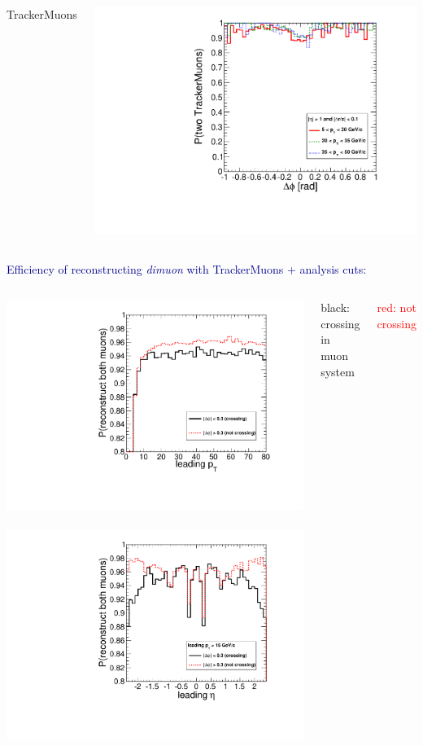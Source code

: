 \documentclass[compress]{beamer}
\begin{document}
\begin{frame}
\begin{columns}
\centering TrackerMuons

\includegraphics[width=\linewidth]{endcap_dphi_bypt_twoTrackerMuons.pdf}
\end{columns}

\vspace{0.35 cm}
\textcolor{darkblue}{Efficiency of reconstructing {\it dimuon} with TrackerMuons + analysis cuts:}

\begin{columns}
\mbox{\hspace{1 cm}\includegraphics[width=0.5\linewidth]{pt_mass5cut_twoTrackerMuons.pdf}
\includegraphics[width=0.5\linewidth]{eta_mass5cut_twoTrackerMuons.pdf}\hspace{-5 cm}}

\scriptsize \centering black: crossing in muon system

\vspace{0.2 cm}
\textcolor{red}{red: not crossing}
\end{columns}
\end{frame}
\end{document}
